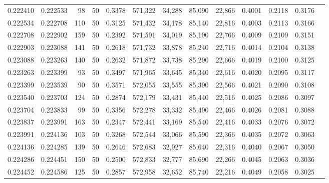 \begin{tabular}{rrrrrrrrrrrrr}
0.222410 & 0.222533 &    98 &  50 &                                     0.3378 & 571,322 &  34,288 &  85,090 &  22,866 & 0.4001 & 0.2118 & 0.3176 \\
0.222534 & 0.222708 &   110 &  50 &                                     0.3125 & 571,432 &  34,178 &  85,140 &  22,816 & 0.4003 & 0.2113 & 0.3166 \\
0.222708 & 0.222902 &   159 &  50 &                                     0.2392 & 571,591 &  34,019 &  85,190 &  22,766 & 0.4009 & 0.2109 & 0.3151 \\
0.222903 & 0.223088 &   141 &  50 &                                     0.2618 & 571,732 &  33,878 &  85,240 &  22,716 & 0.4014 & 0.2104 & 0.3138 \\
0.223088 & 0.223263 &   140 &  50 &                                     0.2632 & 571,872 &  33,738 &  85,290 &  22,666 & 0.4019 & 0.2100 & 0.3125 \\
0.223263 & 0.223399 &    93 &  50 &                                     0.3497 & 571,965 &  33,645 &  85,340 &  22,616 & 0.4020 & 0.2095 & 0.3117 \\
0.223399 & 0.223539 &    90 &  50 &                                     0.3571 & 572,055 &  33,555 &  85,390 &  22,566 & 0.4021 & 0.2090 & 0.3108 \\
0.223540 & 0.223703 &   124 &  50 &                                     0.2874 & 572,179 &  33,431 &  85,440 &  22,516 & 0.4025 & 0.2086 & 0.3097 \\
0.223704 & 0.223833 &    99 &  50 &                                     0.3356 & 572,278 &  33,332 &  85,490 &  22,466 & 0.4026 & 0.2081 & 0.3088 \\
0.223837 & 0.223991 &   163 &  50 &                                     0.2347 & 572,441 &  33,169 &  85,540 &  22,416 & 0.4033 & 0.2076 & 0.3072 \\
0.223991 & 0.224136 &   103 &  50 &                                     0.3268 & 572,544 &  33,066 &  85,590 &  22,366 & 0.4035 & 0.2072 & 0.3063 \\
0.224136 & 0.224285 &   139 &  50 &                                     0.2646 & 572,683 &  32,927 &  85,640 &  22,316 & 0.4040 & 0.2067 & 0.3050 \\
0.224286 & 0.224451 &   150 &  50 &                                     0.2500 & 572,833 &  32,777 &  85,690 &  22,266 & 0.4045 & 0.2063 & 0.3036 \\
0.224452 & 0.224586 &   125 &  50 &                                     0.2857 & 572,958 &  32,652 &  85,740 &  22,216 & 0.4049 & 0.2058 & 0.3025 \\

\end{tabular}

